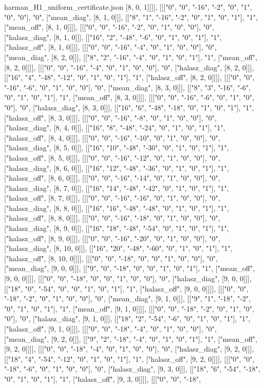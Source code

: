 \begin{filecontents*}[overwrite]{harman_H1_uniform_certificate.json}
[8, 0, 1]]]], [[["0", "0", "-16", "-2", "0", "1", "0", "0"], "0", ["mean_diag", [8, 1, 0]]], [["8", "1", "-16", "-2", "0", "1", "0", "1"], "1", ["mean_off", [8, 1, 0]]]], [[["0", "0", "-16", "-2", "0", "1", "0", "0"], "0", ["halasz_diag", [8, 1, 0]]], [["16", "2", "-48", "-6", "0", "1", "0", "1"], "1", ["halasz_off", [8, 1, 0]]]], [[["0", "0", "-16", "-4", "0", "1", "0", "0"], "0", ["mean_diag", [8, 2, 0]]], [["8", "2", "-16", "-4", "0", "1", "0", "1"], "1", ["mean_off", [8, 2, 0]]]], [[["0", "0", "-16", "-4", "0", "1", "0", "0"], "0", ["halasz_diag", [8, 2, 0]]], [["16", "4", "-48", "-12", "0", "1", "0", "1"], "1", ["halasz_off", [8, 2, 0]]]], [[["0", "0", "-16", "-6", "0", "1", "0", "0"], "0", ["mean_diag", [8, 3, 0]]], [["8", "3", "-16", "-6", "0", "1", "0", "1"], "1", ["mean_off", [8, 3, 0]]]], [[["0", "0", "-16", "-6", "0", "1", "0", "0"], "0", ["halasz_diag", [8, 3, 0]]], [["16", "6", "-48", "-18", "0", "1", "0", "1"], "1", ["halasz_off", [8, 3, 0]]]], [[["0", "0", "-16", "-8", "0", "1", "0", "0"], "0", ["halasz_diag", [8, 4, 0]]], [["16", "8", "-48", "-24", "0", "1", "0", "1"], "1", ["halasz_off", [8, 4, 0]]]], [[["0", "0", "-16", "-10", "0", "1", "0", "0"], "0", ["halasz_diag", [8, 5, 0]]], [["16", "10", "-48", "-30", "0", "1", "0", "1"], "1", ["halasz_off", [8, 5, 0]]]], [[["0", "0", "-16", "-12", "0", "1", "0", "0"], "0", ["halasz_diag", [8, 6, 0]]], [["16", "12", "-48", "-36", "0", "1", "0", "1"], "1", ["halasz_off", [8, 6, 0]]]], [[["0", "0", "-16", "-14", "0", "1", "0", "0"], "0", ["halasz_diag", [8, 7, 0]]], [["16", "14", "-48", "-42", "0", "1", "0", "1"], "1", ["halasz_off", [8, 7, 0]]]], [[["0", "0", "-16", "-16", "0", "1", "0", "0"], "0", ["halasz_diag", [8, 8, 0]]], [["16", "16", "-48", "-48", "0", "1", "0", "1"], "1", ["halasz_off", [8, 8, 0]]]], [[["0", "0", "-16", "-18", "0", "1", "0", "0"], "0", ["halasz_diag", [8, 9, 0]]], [["16", "18", "-48", "-54", "0", "1", "0", "1"], "1", ["halasz_off", [8, 9, 0]]]], [[["0", "0", "-16", "-20", "0", "1", "0", "0"], "0", ["halasz_diag", [8, 10, 0]]], [["16", "20", "-48", "-60", "0", "1", "0", "1"], "1", ["halasz_off", [8, 10, 0]]]], [[["0", "0", "-18", "0", "0", "1", "0", "0"], "0", ["mean_diag", [9, 0, 0]]], [["9", "0", "-18", "0", "0", "1", "0", "1"], "1", ["mean_off", [9, 0, 0]]]], [[["0", "0", "-18", "0", "0", "1", "0", "0"], "0", ["halasz_diag", [9, 0, 0]]], [["18", "0", "-54", "0", "0", "1", "0", "1"], "1", ["halasz_off", [9, 0, 0]]]], [[["0", "0", "-18", "-2", "0", "1", "0", "0"], "0", ["mean_diag", [9, 1, 0]]], [["9", "1", "-18", "-2", "0", "1", "0", "1"], "1", ["mean_off", [9, 1, 0]]]], [[["0", "0", "-18", "-2", "0", "1", "0", "0"], "0", ["halasz_diag", [9, 1, 0]]], [["18", "2", "-54", "-6", "0", "1", "0", "1"], "1", ["halasz_off", [9, 1, 0]]]], [[["0", "0", "-18", "-4", "0", "1", "0", "0"], "0", ["mean_diag", [9, 2, 0]]], [["9", "2", "-18", "-4", "0", "1", "0", "1"], "1", ["mean_off", [9, 2, 0]]]], [[["0", "0", "-18", "-4", "0", "1", "0", "0"], "0", ["halasz_diag", [9, 2, 0]]], [["18", "4", "-54", "-12", "0", "1", "0", "1"], "1", ["halasz_off", [9, 2, 0]]]], [[["0", "0", "-18", "-6", "0", "1", "0", "0"], "0", ["halasz_diag", [9, 3, 0]]], [["18", "6", "-54", "-18", "0", "1", "0", "1"], "1", ["halasz_off", [9, 3, 0]]]], [[["0", "0", "-18", 
\end{filecontents*}
